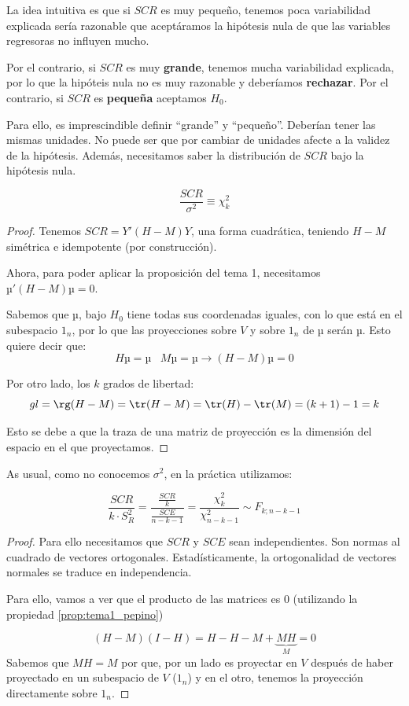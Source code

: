 La idea intuitiva es que si $SCR$ es muy pequeño, tenemos poca variabilidad explicada sería razonable que aceptáramos la hipótesis nula de que las variables regresoras no influyen mucho.

Por el contrario, si $SCR$ es muy \textbf{grande}, tenemos mucha variabilidad explicada, por lo que la hipóteis nula no es muy razonable y deberíamos \textbf{rechazar}. Por el contrario, si $SCR$ es \textbf{pequeña} aceptamos $H_0$.


Para ello, es imprescindible definir ``grande'' y ``pequeño''. Deberían tener las mismas unidades. No puede ser que por cambiar de unidades afecte a la validez de la hipótesis. Además, necesitamos saber la distribución de $SCR$ bajo la hipótesis nula.

\begin{prop}[Distribución SCR en $H_0:∀i\;β_i=0$]

\[
\frac{SCR}{σ^2} \equiv \chi^2_{k}
\]
\end{prop}
\begin{proof}
Tenemos $SCR = Y'(H-M)Y$, una forma cuadrática, teniendo $H-M$ simétrica e idempotente (por construcción).

Ahora, para poder aplicar la proposición del tema 1, necesitamos $µ'(H-M)µ = 0$.

Sabemos que $µ$, bajo $H_0$ tiene todas sus coordenadas iguales, con lo que está en el subespacio $1_n$, por lo que las proyecciones sobre $V$ y sobre $1_n$ de $µ$ serán $µ$. Esto quiere decir que:
\[ Hµ = µ \;\;\; Mµ = µ \to (H-M)µ=0\]


Por otro lado, los $k$ grados de libertad:
\[
gl = \rg(H-M) = \tr(H-M) = \tr(H) - \tr(M) = (k+1)-1 = k
\]

Esto se debe a que la traza de una matriz de proyección es la dimensión del espacio en el que proyectamos.

\end{proof}

As usual, como no conocemos $σ^2$, en la práctica utilizamos:
\begin{prop}
\label{prop:estad_contr_regresion}
\[
\frac{SCR}{k·S_R^2} = \frac{\displaystyle\frac{SCR}{k}}{\displaystyle\frac{SCE}{n-k-1}} = \frac{\chi^2_k}{\chi^2_{n-k-1}}\sim F_{k;n-k-1}
\]
\end{prop}
\begin{proof}
Para ello necesitamos que $SCR$ y $SCE$ sean independientes. Son normas al cuadrado de vectores ortogonales. Estadísticamente, la ortogonalidad de vectores normales se traduce en independencia.

Para ello, vamos a ver que el producto de las matrices es 0 (utilizando la propiedad \ref{prop:tema1_pepino})

\label{prop:SCRIndepSCE}
\[
(H-M)(I-H) = H-H-M+\underbrace{MH}_{M} = 0
\]
Sabemos que $MH=M$ por que, por un lado es proyectar en $V$ después de haber proyectado en un subespacio de $V$ ($1_n$) y en el otro, tenemos la proyección directamente sobre $1_n$.

\end{proof}

